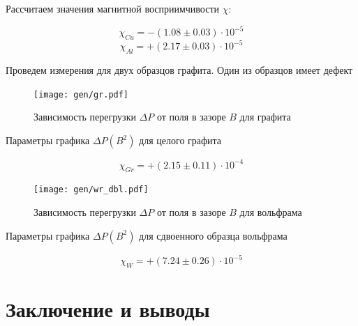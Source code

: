 \documentclass[12pt,a4paper]{article}
\begin{document}
	Рассчитаем значения магнитной восприимчивости $\chi$:
	
	$$\chi_{Cu} = -(1.08 \pm 0.03) \cdot 10^{-5} $$
	$$\chi_{Al} = +(2.17 \pm 0.03) \cdot 10^{-5} $$
	
	Проведем измерения для двух образцов графита. Один из образцов имеет дефект
	
	\begin{figure}[H]
		\texttt{[image: gen/gr.pdf]}
		\caption{Зависимость перегрузки $\Delta P$ от поля в зазоре $B$ для графита}
	\end{figure}
	
	\begin{table}[h]
		\caption{Параметры графика $\Delta P(B^2)$ для целого графита}
		
	\end{table}
	
	$$\chi_{Gr} = +(2.15 \pm 0.11) \cdot 10^{-4} $$
	
	\begin{figure}[H]
		\texttt{[image: gen/wr\_dbl.pdf]}
		\caption{Зависимость перегрузки $\Delta P$ от поля в зазоре $B$ для вольфрама}
	\end{figure}
	
	\begin{table}[h]
		\caption{Параметры графика $\Delta P(B^2)$ для сдвоенного образца вольфрама}
		
	\end{table}
	
	$$\chi_{W} = +(7.24 \pm 0.26) \cdot 10^{-5} $$
	
	
	\section*{Заключение и выводы}
	
	
\end{document}
